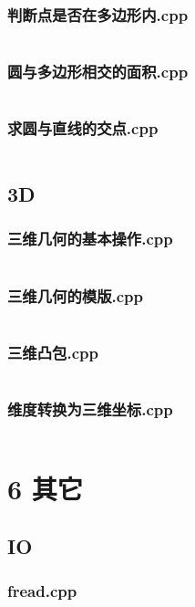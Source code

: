 \documentclass{article}
\begin{document}
\subsubsection{判断点是否在多边形内.cpp}
\inputminted{c++}{/home/zzuzxy/t2/Template1.0/5 几何/2D/判断点是否在多边形内.cpp}
\subsubsection{圆与多边形相交的面积.cpp}
\inputminted{c++}{/home/zzuzxy/t2/Template1.0/5 几何/2D/圆与多边形相交的面积.cpp}
\subsubsection{求圆与直线的交点.cpp}
\inputminted{c++}{/home/zzuzxy/t2/Template1.0/5 几何/2D/求圆与直线的交点.cpp}
\subsection{3D}
\subsubsection{三维几何的基本操作.cpp}
\inputminted{c++}{/home/zzuzxy/t2/Template1.0/5 几何/3D/三维几何的基本操作.cpp}
\subsubsection{三维几何的模版.cpp}
\inputminted{c++}{/home/zzuzxy/t2/Template1.0/5 几何/3D/三维几何的模版.cpp}
\subsubsection{三维凸包.cpp}
\inputminted{c++}{/home/zzuzxy/t2/Template1.0/5 几何/3D/三维凸包.cpp}
\subsubsection{维度转换为三维坐标.cpp}
\inputminted{c++}{/home/zzuzxy/t2/Template1.0/5 几何/3D/维度转换为三维坐标.cpp}
\section{6 其它}
\subsection{IO}
\subsubsection{fread.cpp}
\inputminted{c++}{/home/zzuzxy/t2/Template1.0/6 其它/IO/fread.cpp}
\end{document}
